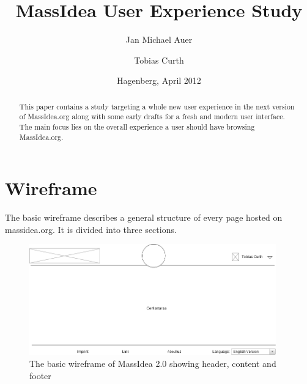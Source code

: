 \documentclass[a4paper, notitlepage, oneside]{article}
\begin{document}
\title{MassIdea User Experience Study}
\author{Jan Michael Auer \and Tobias Curth}
\date{Hagenberg, April 2012}
\maketitle

\vspace{3cm}

\begin{abstract}
This paper contains a study targeting a whole new user experience in the next version of MassIdea.org along with some early drafts for a fresh and modern user interface. The main focus lies on the overall experience a user should have browsing MassIdea.org.
\end{abstract}
\pagebreak

\tableofcontents
\pagebreak

\section{Wireframe}
\label{sec:wireframe}

The basic wireframe describes a general structure of every page hosted on massidea.org. It is divided into three sections.

\begin{figure}[htb]
	\centering
	\includegraphics[width=0.95\textwidth]{wire}
	\caption{The basic wireframe of MassIdea 2.0 showing header, content and footer}
	\label{fig:wireframe}
\end{figure}
\end{document}
